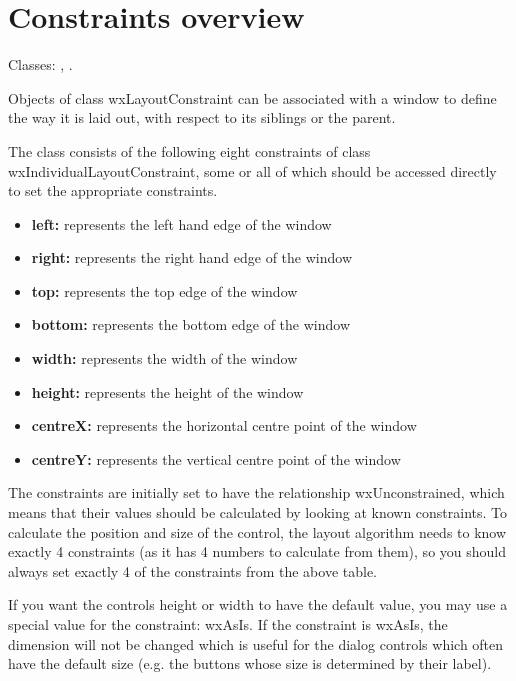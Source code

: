 \section{Constraints overview}\label{constraintsoverview}

Classes: , .

Objects of class wxLayoutConstraint can be associated with a window to define
the way it is laid out, with respect to its siblings or the parent.

The class consists of the following eight constraints of class wxIndividualLayoutConstraint,
some or all of which should be accessed directly to set the appropriate
constraints.

\begin{itemize}\itemsep=0pt
\item {\bf left:} represents the left hand edge of the window
\item {\bf right:} represents the right hand edge of the window
\item {\bf top:} represents the top edge of the window
\item {\bf bottom:} represents the bottom edge of the window
\item {\bf width:} represents the width of the window
\item {\bf height:} represents the height of the window
\item {\bf centreX:} represents the horizontal centre point of the window
\item {\bf centreY:} represents the vertical centre point of the window
\end{itemize}

The constraints are initially set to have the relationship wxUnconstrained,
which means that their values should be calculated by looking at known constraints.
To calculate the position and size of the control, the layout algorithm needs to
know exactly 4 constraints (as it has 4 numbers to calculate from them), so you
should always set exactly 4 of the constraints from the above table.

If you want the controls height or width to have the default value, you may use
a special value for the constraint: wxAsIs. If the constraint is wxAsIs, the
dimension will not be changed which is useful for the dialog controls which
often have the default size (e.g. the buttons whose size is determined by their
label).

